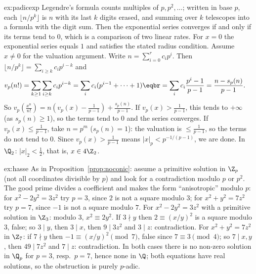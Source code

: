 \begin{solution}{ex:padicexp}
\idea Legendre's formula counts multiples of $p,p^2,\dots$; written in base $p$, each $\lfloor n/p^k\rfloor$ is $n$ with its last $k$ digits erased, and summing over $k$ telescopes into a formula with the digit sum. Then the exponential series converges if and only if its terms tend to $0$, which is a comparison of two linear rates.
\writeup For $x=0$ the exponential series equals $1$ and satisfies the stated radius condition. Assume $x\ne0$ for the valuation argument. Write $n=\sum_{i=0}^rc_ip^i$. Then $\lfloor n/p^k\rfloor=\sum_{i\ge k}c_ip^{i-k}$ and
\[
\begin{aligned}v_p(n!)&=\sum_{k\ge1}\sum_{i\ge k}c_ip^{i-k}=\sum_ic_i(p^{i-1}+\dots+1)\eqbr=\sum_ic_i\frac{p^i-1}{p-1}=\frac{n-s_p(n)}{p-1}.\end{aligned}
\]
So $v_p\left(\frac{x^n}{n!}\right)=n\left(v_p(x)-\frac1{p-1}\right)+\frac{s_p(n)}{p-1}$. If $v_p(x)>\frac1{p-1}$, this tends to $+\infty$ (as $s_p(n)\ge1$), so the terms tend to $0$ and the series converges. If $v_p(x)\le\frac1{p-1}$, take $n=p^m$ ($s_p(n)=1$): the valuation is $\le\frac1{p-1}$, so the terms do not tend to $0$. Since $v_p(x)>\frac1{p-1}$ means $|x|_p<p^{-1/(p-1)}$, we are done. In $\Q_2$: $|x|_2<\frac12$, that is, $x\in4\Z_2$.
\end{solution}

\begin{solution}{ex:hasse}
\idea As in Proposition~\ref{prop:noconic}: assume a primitive solution in $\Z_p$ (not all coordinates divisible by $p$) and look for a contradiction modulo $p$ or $p^2$. The good prime divides a coefficient and makes the form ``anisotropic'' modulo $p$: for $x^2-2y^2=3z^2$ try $p=3$, since $2$ is not a square modulo $3$; for $x^2+y^2=7z^2$ try $p=7$, since $-1$ is not a square modulo $7$.
\writeup For $x^2-2y^2=3z^2$ with a primitive solution in $\Z_3$: modulo $3$, $x^2\equiv2y^2$. If $3\nmid y$ then $2\equiv(x/y)^2$ is a square modulo $3$, false; so $3\mid y$, then $3\mid x$, then $9\mid3z^2$ and $3\mid z$: contradiction. For $x^2+y^2=7z^2$ in $\Z_7$: if $7\nmid y$ then $-1\equiv(x/y)^2\pmod7$, false since $7\equiv3\pmod4$; so $7\mid x,y$, then $49\mid7z^2$ and $7\mid z$: contradiction. In both cases there is no non-zero solution in $\Q_p$ for $p=3$, resp.\ $p=7$, hence none in $\Q$; both equations have real solutions, so the obstruction is purely $p$-adic.
\end{solution}

